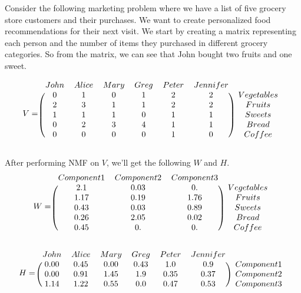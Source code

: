 Consider the following marketing problem where we have a list of five grocery store customers and their purchases.
We want to create personalized food recommendations for their next visit. 
We start by creating a matrix representing each person and the number of items they purchased in different grocery categories.
So from the matrix, we can see that John bought two fruits and one sweet.
%

\[
V = 
\begin{blockarray}{ccccccc}
  John & Alice & Mary & Greg & Peter & Jennifer \\
  \begin{block}{(cccccc)c}
     0 & 1 & 0 & 1 & 2 & 2 & Vegetables \\
     2 & 3 & 1 & 1 & 2 & 2 & Fruits \\
     1 & 1 & 1 & 0 & 1 & 1 & Sweets \\
     0 & 2 & 3 & 4 & 1 & 1 & Bread \\
     0 & 0 & 0 & 0 & 1 & 0 & Coffee \\
  \end{block}
  \end{blockarray}
\]

After performing NMF on $V$, we'll get the following $W$ and $H$.
\[
W = 
\begin{blockarray}{cccc}
   Component 1 & Component 2 & Component 3\\
  \begin{block}{(ccc)c} 	
	2.1 & 0.03 & 0. & Vegetables\\
	1.17 & 0.19 & 1.76 & Fruits\\
    0.43 & 0.03 & 0.89 & Sweets\\
    0.26 & 2.05 & 0.02 & Bread\\
    0.45 & 0.  & 0.  & Coffee\\
   \end{block}
   \end{blockarray}
\]

\[
H = 
\begin{blockarray}{ccccccc}
  John & Alice & Mary & Greg & Peter & Jennifer\\
  \begin{block}{(cccccc)c} 	
   0.00  & 0.45 & 0.00 & 0.43 &  1.0   &   0.9 & Component 1\\
   0.00  & 0.91 & 1.45 & 1.9 &  0.35   &   0.37 & Component 2\\
   1.14  & 1.22 & 0.55 & 0.0 &  0.47   &   0.53 & Component 3\\
   \end{block}
   \end{blockarray}
\]

